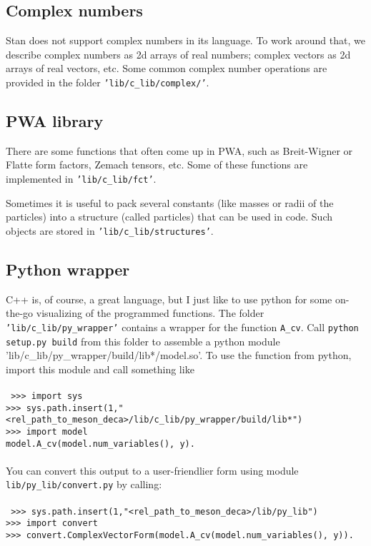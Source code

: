 \documentclass[a4paper]{article}
\begin{document}
\subsection{Complex numbers}
Stan does not support complex numbers in its language. To work around that, we describe complex numbers as 2d arrays of real numbers;
complex vectors as 2d arrays of real vectors, etc. Some common complex number operations are provided in the folder \texttt{'lib/c\_lib/complex/'}.

\subsection{PWA library}
There are some functions that often come up in PWA, such as Breit-Wigner or Flatte form factors, Zemach tensors, etc. Some of these
functions are implemented in \texttt{'lib/c\_lib/fct'}.

Sometimes it is useful to pack several constants (like masses or radii of the particles) into a structure (called particles) that can be
used in code. Such objects are stored in \texttt{'lib/c\_lib/structures'}.

\subsection{Python wrapper}
C++ is, of course, a great language, but I just like to use python for some on-the-go visualizing of the programmed functions.
The folder \texttt{'lib/c\_lib/py\_wrapper'} contains a wrapper for the function \texttt{A\_cv}. Call \texttt{python setup.py build}
from this folder to assemble a python module 'lib/c\_lib/py\_wrapper/build/lib*/model.so'. To use the function from python, import this
module and call something like \\
\quad\\
\texttt{
\qquad >>> import sys\\
\qquad >>> sys.path.insert(1,"<rel\_path\_to\_meson\_deca>/lib/c\_lib/py\_wrapper/build/lib*")\\
\qquad >>> import model\\
\qquad model.A\_cv(model.num\_variables(), y).\\
}
\quad\\
You can convert this output to a user-friendlier form using module \texttt{lib/py\_lib/convert.py} by calling:\\
\quad\\
\texttt{
\qquad >>> sys.path.insert(1,"<rel\_path\_to\_meson\_deca>/lib/py\_lib")\\
\qquad >>> import convert\\
\qquad >>> convert.ComplexVectorForm(model.A\_cv(model.num\_variables(), y)).\\
}
\end{document}
